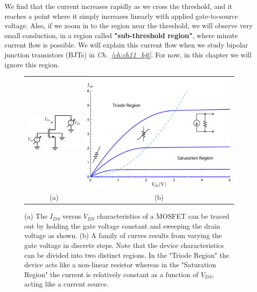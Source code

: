 We find that the current increases rapidly as we cross the threshold, and it reaches a point where it simply increases linearly with applied gate-to-source voltage.  Also, if we zoom in to the region near the threshold, we will observe very small conduction, in a region called \textbf{"sub-threshold region"}, where minute current flow is possible.  We will explain this current flow when we study bipolar junction transistors (BJTs) in \emph{Ch.~\ref{ch:ch11_bjt}}. For now, in this chapter we will ignore this region.
\newpage
\begin{figure}[t]
\centering
\begin{tabular}{cc}
\includegraphics[width=.4\columnwidth]{idvds_sweep} &
\includegraphics[width=.5\columnwidth]{ids_vds}\\
(a) & (b)\\
\end{tabular}
\caption{(a) The $I_{DS}$ versus $V_{DS}$ characteristics of a MOSFET can be traced out by holding the gate voltage constant and sweeping the drain voltage as shown.  (b) A family of curves results from varying the gate voltage in discrete steps.  Note that the device characteristics can be divided into two distinct regions.  In the "Triode Region" the device acts like a non-linear resistor whereas in the "Saturation Region" the current is relatively constant as a function of $V_{DS}$, acting like a current source.}
\label{fig:ids_vds}
\end{figure}
